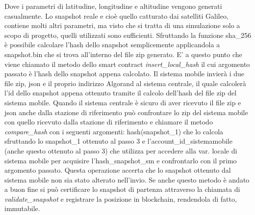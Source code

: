 Dove i parametri di latitudine, longitudine e altitudine vengono generati casualmente. Lo snapshot reale e cioè quello catturato dai satelliti Galileo, contiene molti altri parametri, ma visto che si tratta di una simulazione solo a scopo di progetto, quelli utilizzati sono sufficienti. Sfruttando la funzione sha\_256 è possibile calcolare l'hash dello snapshot semplicemente applicandola a snapshot.bin che si trova all'interno del file zip generato. E' a questo punto che viene chiamato il metodo dello smart contract \textit{insert\_local\_hash} il cui argomento passato è l'hash dello snapshot appena calcolato. Il sistema mobile invierà i due file zip, json e il proprio indirizzo Algorand al sistema centrale, il quale calcolerà l'id dello snapshot appena ottenuto tramite il calcolo dell'hash del file zip del sistema mobile. Quando il sistema centrale è sicuro di aver ricevuto il file zip e json anche dalla stazione di riferimento può confrontare lo zip del sistema mobile con quello ricevuto dalla stazione di riferimento e chiamare il metodo \textit{compare\_hash} con i seguenti argomenti: hash(snapshot\_1) che lo calcola sfruttando lo snapshot\_1 ottenuto al passo 3 e l'account\_id\_sistemamobile  (anche questo ottenuto al passo 3) che utilizza per accedere alla var. locale di sistema mobile per acquisire l’hash\_snapshot\_sm e confrontarlo con il primo argomento passato. Questa operazione accerta che lo snapshot ottenuto dal sistema mobile non sia stato alterato nell'invio. Se anche questo metodo è andato a buon fine si può certificare lo snapshot di partenza attraverso la chiamata di \textit{validate\_snapshot} e registrare la posizione in blockchain, rendendola di fatto, immutabile.

